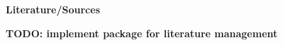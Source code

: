 \begin{Large}
\textbf{Literature/Sources}
\end{Large}

\textbf{TODO: implement package for literature management}